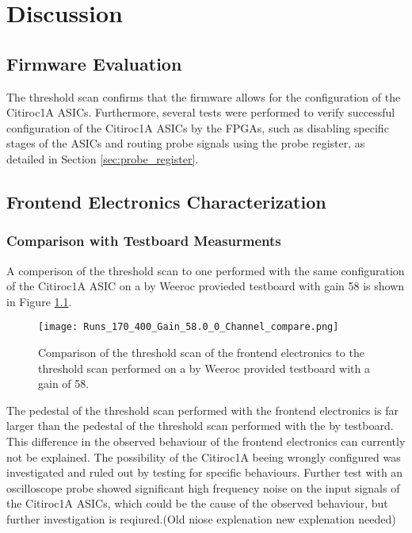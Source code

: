 \chapter{Discussion}\label{cha: discussion}
\section{Firmware Evaluation}
The threshold scan confirms that the firmware allows for the configuration of the Citiroc1A ASICs.
\newline
Furthermore, several tests were performed to verify successful configuration of the Citiroc1A ASICs by the FPGAs,
such as disabling specific stages of the ASICs and routing probe signals using the probe register, as detailed in Section \ref{sec:probe_register}.
\section{Frontend Electronics Characterization}
\subsection{Comparison with Testboard Measurments} 
A comperison of the threshold scan to one performed with the same configuration of the Citiroc1A ASIC on a by Weeroc provieded testboard with gain 58 is shown in Figure \ref{fig:threshold_scan_comparison_58}.%
\begin{figure}[H]
    \centering
    \texttt{[image: Runs\_170\_400\_Gain\_58.0\_0\_Channel\_compare.png]}
    \caption{Comparison of the threshold scan of the frontend electronics to the threshold scan performed on a by Weeroc provided testboard with a gain of 58.}
    \label{fig:threshold_scan_comparison_58}
\end{figure}

The pedestal of the threshold scan performed with the frontend electronics is far larger than the pedestal of the threshold scan performed with the by testboard.
This difference in the observed behaviour of the frontend electronics can currently not be explained. The possibility of the Citiroc1A beeing wrongly configured was investigated and ruled out by testing for specific behaviours.
Further test with an oscilloscope probe showed significant high frequency noise on the input signals of the Citiroc1A ASICs,
which could be the cause of the observed behaviour, but further investigation is reqiured.(Old niose explenation new explenation needed)

